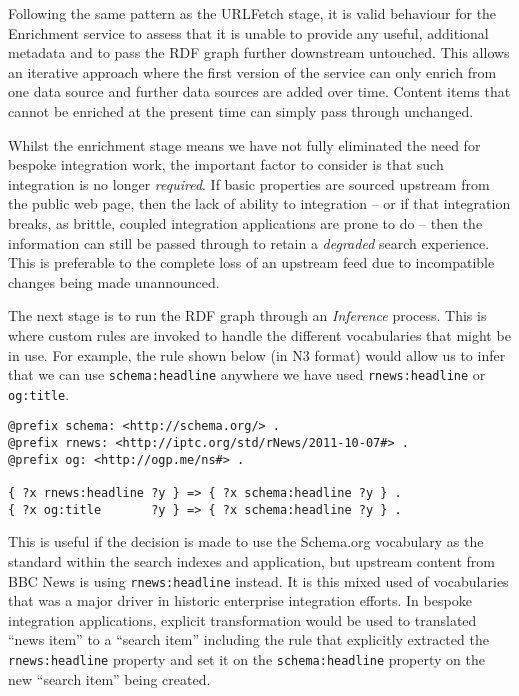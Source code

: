 Following the same pattern as the URLFetch stage, it is valid behaviour
for the Enrichment service to assess that it is unable to provide
any useful, additional metadata and to pass the RDF graph further
downstream untouched. This allows an iterative approach where the first
version of the service can only enrich from one data source and
further data sources are added over time. Content items that cannot be
enriched at the present time can simply pass through unchanged.

Whilst the enrichment stage means we have not fully eliminated the
need for bespoke integration work, the important factor to consider is that
such integration is no longer \emph{required}. If basic properties
are sourced upstream from the public web page, then the lack
of ability to integration -- or if that integration breaks, as brittle,
coupled integration applications are prone to do -- then the information
can still be passed through to retain a \emph{degraded} search
experience. This is preferable to the complete loss of an upstream feed
due to incompatible changes being made unannounced.

The next stage is to run the RDF graph through an \emph{Inference} process.
This is where custom rules are invoked to handle the different
vocabularies that might be in use. For example, the rule shown below
(in N3 format) would allow us to infer that we can
use \texttt{schema:headline} anywhere we have used \texttt{rnews:headline}
or \texttt{og:title}.

\begin{centering}
\begin{lstlisting}[language=ttl]
@prefix schema: <http://schema.org/> .
@prefix rnews: <http://iptc.org/std/rNews/2011-10-07#> .
@prefix og: <http://ogp.me/ns#> .

{ ?x rnews:headline ?y } => { ?x schema:headline ?y } .
{ ?x og:title       ?y } => { ?x schema:headline ?y } .
\end{lstlisting}
\end{centering}

This is useful if the decision is made to use the Schema.org vocabulary as
the standard within the search indexes and application, but upstream
content from BBC News is using \texttt{rnews:headline} instead. It is this
mixed used of vocabularies that was a major driver in historic
enterprise integration efforts. In bespoke integration applications, explicit
transformation would be used to translated  ``news item'' to a
``search item'' including the rule that explicitly extracted the
\texttt{rnews:headline} property and set it on the \texttt{schema:headline}
property on the new ``search item'' being created.

